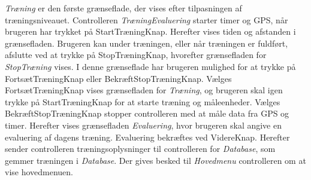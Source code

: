 \noindent
\textit{Træning} er den første grænseflade, der vises efter tilpasningen af træningsniveauet. Controlleren \textit{TræningEvaluering} starter timer og GPS, når brugeren har trykket på StartTræningKnap. Herefter vises tiden og afstanden i grænsefladen. Brugeren kan under træningen, eller når træningen er fuldført, afslutte ved at trykke på StopTræningKnap, hvorefter grænsefladen for \textit{StopTræning} vises. I denne grænseflade har brugeren mulighed for at trykke på FortsætTræningKnap eller BekræftStopTræningKnap. Vælges FortsætTræningKnap vises grænsefladen for \textit{Træning}, og brugeren skal igen trykke på StartTræningKnap for at starte træning og måleenheder. Vælges BekræftStopTræningKnap stopper controlleren med at måle data fra GPS og timer. Herefter vises grænsefladen \textit{Evaluering}, hvor brugeren skal angive en evaluering af dagens træning. Evaluering bekræftes ved VidereKnap. Herefter sender controlleren træningsoplysninger til controlleren for \textit{Database}, som gemmer træningen i \textit{Database}. Der gives besked til \textit{Hovedmenu} controlleren om at vise hovedmenuen.



